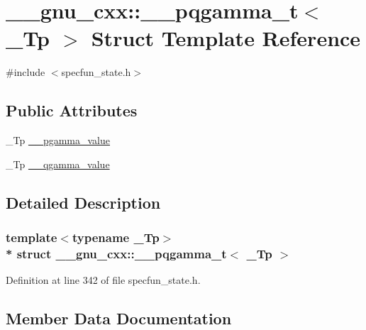 \hypertarget{struct____gnu__cxx_1_1____pqgamma__t}{}\section{\+\_\+\+\_\+gnu\+\_\+cxx\+:\+:\+\_\+\+\_\+pqgamma\+\_\+t$<$ \+\_\+\+Tp $>$ Struct Template Reference}
\label{struct____gnu__cxx_1_1____pqgamma__t}


{\ttfamily \#include $<$specfun\+\_\+state.\+h$>$}

\subsection*{Public Attributes}
\begin{DoxyCompactItemize}
\item 
\+\_\+\+Tp \hyperlink{struct____gnu__cxx_1_1____pqgamma__t_aa12fa3fb5718738b5cb10fb1ac0eee46}{\+\_\+\+\_\+pgamma\+\_\+value}
\item 
\+\_\+\+Tp \hyperlink{struct____gnu__cxx_1_1____pqgamma__t_ab053b01578e22ba923ca2a4007b1f0a7}{\+\_\+\+\_\+qgamma\+\_\+value}
\end{DoxyCompactItemize}


\subsection{Detailed Description}
\subsubsection*{template$<$typename \+\_\+\+Tp$>$\\*
struct \+\_\+\+\_\+gnu\+\_\+cxx\+::\+\_\+\+\_\+pqgamma\+\_\+t$<$ \+\_\+\+Tp $>$}



Definition at line 342 of file specfun\+\_\+state.\+h.



\subsection{Member Data Documentation}
